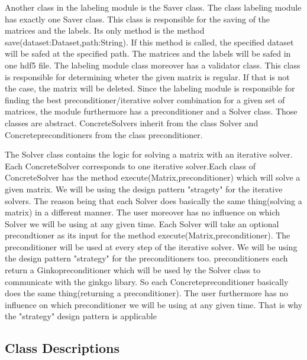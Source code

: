 \documentclass[parskip=full]{scrartcl}
\begin{document}
Another class in the labeling module is the Saver class. The class labeling module has exactly one Saver class. This class is responsible for the saving of the matrices and the labels. Its only method is the method save(dataset:Dataset,path:String). If this method is called, the specified dataset will be safed at the specified path. The matrices and the labels will be safed in one hdf5 file.\newline
\newline
The labeling module class moreover has a validator class. This class is responsible for determining wheter the given matrix is regular. If that is not the case, the matrix will be deleted.
\newline\newline
Since the labeling module is responsible for finding the best \gls{preconditioner}/\gls{iterative solver} combination for a given set of matrices, the module furthermore has a \gls{preconditioner} and a Solver class. Those classes are abstract. ConcreteSolvers inherit from the class Solver and Concrete\gls{preconditioner}s from the class \gls{preconditioner}.\newline\newline

The Solver class contains the logic for solving a matrix with an \gls{iterative solver}. Each ConcreteSolver corresponds to one \gls{iterative solver}.Each class of ConcreteSolver has the method execute(Matrix,\gls{preconditioner}) which will solve a given matrix. We will be using the design pattern "stragety" for the \gls{iterative solver}s. The reason being that each Solver does basically the same thing(solving a matrix) in a different manner. The user moreover has no influence on which Solver we will be using at any given time. 
Each Solver will take an optional precondtioner as its input for the method execute(Matrix,\gls{preconditioner}). The \gls{preconditioner} will be used at every step of the \gls{iterative solver}. We will be using the design pattern "\gls{strategy}" for the \gls{preconditioner}s too. \gls{preconditioner}s each return a Ginko\gls{preconditioner} which will be used by the Solver class to communicate with the ginkgo libary. So each Concrete\gls{preconditioner} basically does the same thing(returning a \gls{preconditioner}). The user furthermore has no influence on which \gls{preconditioner} we will be using at any given time. That is why the "\gls{strategy}" design pattern is applicable

\subsection{Class Descriptions}
\end{document}

